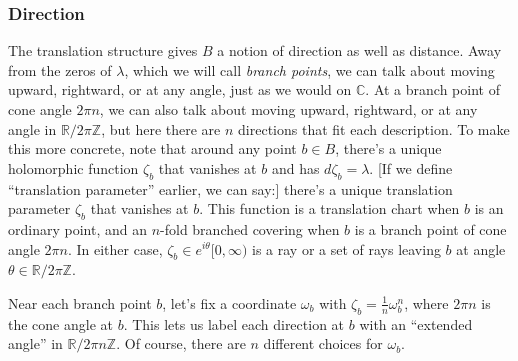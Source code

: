 \documentclass{article}
\newcommand{\Z}{\mathbb{Z}}
\newcommand{\R}{\mathbb{R}}
\newcommand{\C}{\mathbb{C}}
\theoremstyle{definition}
\theoremstyle{plain}
\begin{document}
\subsubsection{Direction}\label{transl:dir}
%
The translation structure gives $B$ a notion of direction as well as distance. Away from the zeros of $\lambda$, which we will call {\em branch points}, we can talk about moving upward, rightward, or at any angle, just as we would on $\C$. At a branch point of cone angle $2\pi n$, we can also talk about moving upward, rightward, or at any angle in $\R/2\pi\Z$, but here there are $n$ directions that fit each description. To make this more concrete, note that around any point $b \in B$, there's a unique holomorphic function $\zeta_b$ that vanishes at $b$ and has $d\zeta_b = \lambda$. \textcolor{VioletRed}{[If we define ``translation parameter'' earlier, we can say:] there's a unique translation parameter $\zeta_b$ that vanishes at $b$.} This function is a translation chart when $b$ is an ordinary point, and an $n$-fold branched covering when $b$ is a branch point of cone angle $2\pi n$. In either case, $\zeta_b \in e^{i\theta} [0, \infty)$ is a ray or a set of rays leaving $b$ at angle $\theta \in \R/2\pi\Z$.
%

Near each branch point $b$, let's fix a coordinate $\omega_b$ with $\zeta_b = \tfrac{1}{n} \omega_b^n$, where $2\pi n$ is the cone angle at $b$. This lets us label each direction at $b$ with an ``extended angle'' in $\R/2\pi n\Z$. Of course, there are $n$ different choices for $\omega_b$.
%
\end{document}
